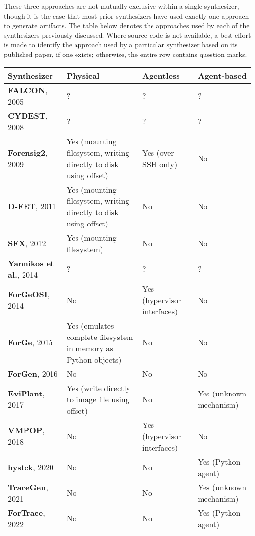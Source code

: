 These three approaches are not mutually exclusive within a single
synthesizer, though it is the case that most prior synthesizers have
used exactly one approach to generate artifacts. The table below denotes
the approaches used by each of the synthesizers previously discussed.
Where source code is not available, a best effort is made to identify
the approach used by a particular synthesizer based on its published
paper, if one exists; otherwise, the entire row contains question marks.

\begin{longtable}[]{@{}
  >{\raggedright\arraybackslash}p{}
  >{\raggedright\arraybackslash}p{}
  >{\raggedright\arraybackslash}p{}
  >{\raggedright\arraybackslash}p{}@{}}
\toprule\noalign{}
\begin{minipage}[b]{\linewidth}\raggedright
Synthesizer
\end{minipage} & \begin{minipage}[b]{\linewidth}\raggedright
Physical
\end{minipage} & \begin{minipage}[b]{\linewidth}\raggedright
Agentless
\end{minipage} & \begin{minipage}[b]{\linewidth}\raggedright
Agent-based
\end{minipage} \\
\midrule\noalign{}
\endhead
\bottomrule\noalign{}
\endlastfoot
\textbf{FALCON}, 2005 & ? & ? & ? \\
\textbf{CYDEST}, 2008 & ? & ? & ? \\
\textbf{Forensig2}, 2009 & Yes (mounting filesystem, writing directly to
disk using offset) & Yes (over SSH only) & No \\
\textbf{D-FET}, 2011 & Yes (mounting filesystem, writing directly to
disk using offset) & No & No \\
\textbf{SFX}, 2012 & Yes (mounting filesystem) & No & No \\
\textbf{Yannikos et al.}, 2014 & ? & ? & ? \\
\textbf{ForGeOSI}, 2014 & No & Yes (hypervisor interfaces) & No \\
\textbf{ForGe}, 2015 & Yes (emulates complete filesystem in memory as
Python objects) & No & No \\
\textbf{ForGen}, 2016 & No & No & No \\
\textbf{EviPlant}, 2017 & Yes (write directly to image file using
offset) & No & Yes (unknown mechanism) \\
\textbf{VMPOP}, 2018 & No & Yes (hypervisor interfaces) & No \\
\textbf{hystck}, 2020 & No & No & Yes (Python agent) \\
\textbf{TraceGen}, 2021 & No & No & Yes (unknown mechanism) \\
\textbf{ForTrace}, 2022 & No & No & Yes (Python agent) \\
\end{longtable}

